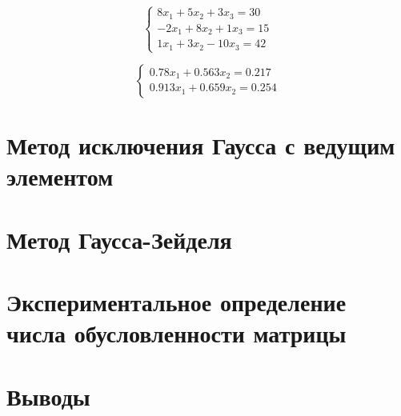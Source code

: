 \documentclass[a4paper]{article}
\begin{document}
\begin{equation}
    \begin{cases}
        8  x_1 + 5 x_2  +3   x_3 = 30 \\
        -2 x_1 + 8 x_2  +1   x_3 = 15 \\
        1  x_1 + 3 x_2  -10 x_3 = 42
    \end{cases} \label{slau:4}
\end{equation}

\begin{equation}
    \begin{cases}
        0.78  x_1 + 0.563 x_2 = 0.217 \\
        0.913 x_1 + 0.659 x_2 = 0.254
    \end{cases} \label{slau:5}
\end{equation}

\section{Метод исключения Гаусса с ведущим элементом}

\section{Метод Гаусса-Зейделя}

\section{Экспериментальное определение числа обусловленности матрицы}
\section{Выводы}
\end{document}
